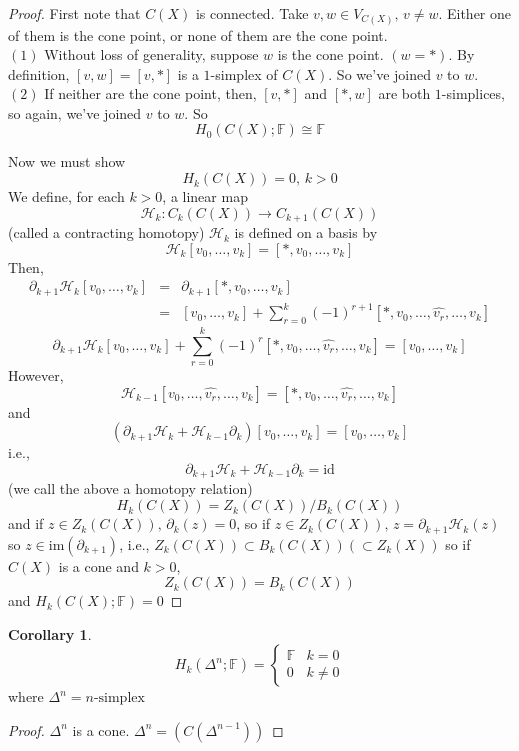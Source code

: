 \documentclass[a4paper,14pt]{extarticle}
\theoremstyle{definition}
\newtheorem*{corollary}{Corollary}
\begin{document}
\begin{proof}
	First note that $C(X)$ is connected. Take $v,w\in V_{C(X)}, \,v\neq w$. Either one of them is 
	the cone point, or none of them are the cone point. \\

	$(1)$ Without loss of generality,
	suppose $w$ is the cone point. $(w=*)$. By definition, $[v,w]=[v,*]$ is a $1$-simplex of
	$C(X)$. So we've joined $v$ to $w$. \\

	$(2)$ If neither are the cone point, then, $[v,*]$ and $[*,w]$ are both $1$-simplices, so again,
	we've joined $v$ to $w$. So \[H_0(C(X);\mathbb{F})\cong \mathbb{F}\]

	Now we must show \[H_k(C(X))=0, \,k>0\] We define, for each $k>0$, a linear map
	\[\mathcal{H}_k:C_k(C(X))\rightarrow C_{k+1}(C(X))\] (called a contracting homotopy)
	$\mathcal{H}_k$ is defined on a basis by \[\mathcal{H}_k[v_0,\ldots,v_k]=[*,v_0,\ldots,v_k]\]
	Then,
	\begin{eqnarray*}
		\partial_{k+1}\mathcal{H}_k[v_0,\ldots,v_k]&=&\partial_{k+1}[*,v_0,\ldots,v_k] \\
					&=&[v_0,\ldots,v_k]+\sum_{r=0}^k(-1)^{r+1}[*,v_0,\ldots,\hat{v_r},\ldots,v_k]
	\end{eqnarray*}
	\[\partial_{k+1}\mathcal{H}_k
	[v_0,\ldots,v_k]+\sum_{r=0}^k(-1)^r[*,v_0,\ldots,\hat{v_r},\ldots,v_k]
	=[v_0,\ldots,v_k]\] However,
	\[\mathcal{H}_{k-1}[v_0,\ldots,\hat{v_r},\ldots,v_k]=[*,v_0,\ldots,\hat{v_r},\ldots,v_k]\]
	and
	\[(\partial_{k+1}\mathcal{H}_k+\mathcal{H}_{k-1}\partial_{k})[v_0,\ldots,v_k]=
	[v_0,\ldots,v_k]\] i.e.,
	\[\partial_{k+1}\mathcal{H}_k + \mathcal{H}_{k-1}\partial_{k}=\text{id}\]
	(we call the above a homotopy relation)
	\[H_k(C(X))=Z_k(C(X))/B_k(C(X))\] and if $z\in Z_k(C(X)),\,\partial_k(z)=0$, so 
	if $z\in Z_k(C(X)), \,z=\partial_{k+1}\mathcal{H}_k(z)$ so $z\in\text{im}(\partial_{k+1})$,
	i.e., $Z_k(C(X))\subset B_k(C(X)) (\subset Z_k(X))$ so if $C(X)$ is a cone and $k>0$,
	\[Z_k(C(X))=B_k(C(X))\] and $H_k(C(X);\mathbb{F})=0$
\end{proof}

\begin{corollary}
	\[H_k(\Delta^n;\mathbb{F})=\begin{cases}\mathbb{F}&k=0\\0&k\neq0\end{cases}\]
	where $\Delta^n=\text{$n$-simplex}$
\end{corollary}

\begin{proof}
	$\Delta^n$ is a cone. $\Delta^n=(C(\Delta^{n-1}))$
\end{proof}
\end{document}
